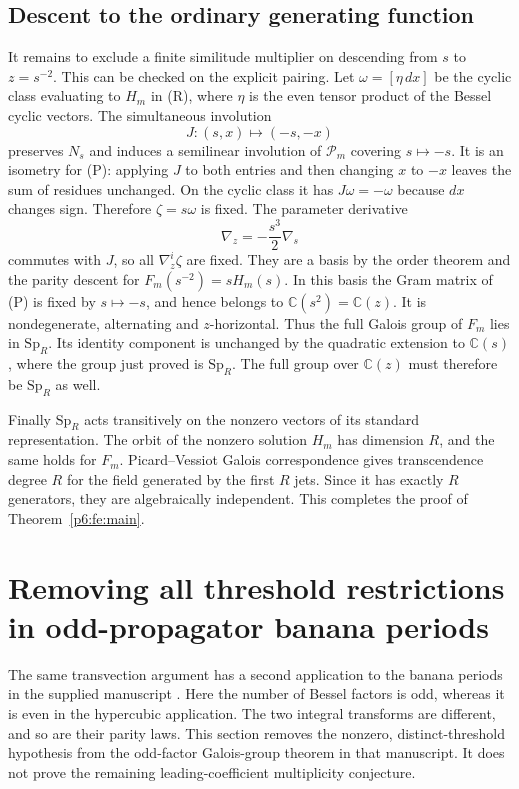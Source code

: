 \documentclass[11pt,a4paper]{article}
\theoremstyle{definition}
\theoremstyle{remark}
\numberwithin{equation}{section}
\begin{document}
\subsection{Descent to the ordinary generating function}

It remains to exclude a finite similitude multiplier on descending
from $s$ to $z=s^{-2}$. This can be checked on the explicit pairing.
Let $\omega=[\eta\,dx]$ be the cyclic class evaluating to $H_m$ in
(R), where $\eta$ is the even tensor product of the Bessel cyclic
vectors. The simultaneous involution
\[
 J:(s,x)\longmapsto(-s,-x)
\]
preserves $N_s$ and induces a semilinear involution of $\mathcal P_m$
covering $s\mapsto-s$. It is an isometry for (P): applying $J$ to
both entries and then changing $x$ to $-x$ leaves the sum of
residues unchanged. On the cyclic class it has $J\omega=-\omega$
because $dx$ changes sign. Therefore $\zeta=s\omega$ is fixed.
The parameter derivative
\[
 \nabla_z=-\frac{s^3}{2}\nabla_s
\]
commutes with $J$, so all $\nabla_z^i\zeta$ are fixed. They are a
basis by the order theorem and the parity descent for
$F_m(s^{-2})=sH_m(s)$. In this basis the Gram matrix of (P) is fixed
by $s\mapsto-s$, and hence belongs to
$\mathbb C(s^2)=\mathbb C(z)$. It is nondegenerate, alternating
and $z$-horizontal. Thus the full Galois group of $F_m$ lies in
$\mathrm{Sp}_R$. Its identity component is unchanged by the
quadratic extension to $\mathbb C(s)$, where the group just proved
is $\mathrm{Sp}_R$. The full group over $\mathbb C(z)$ must therefore
be $\mathrm{Sp}_R$ as well.

Finally $\mathrm{Sp}_R$ acts transitively on the nonzero vectors of
its standard representation. The orbit of the nonzero solution
$H_m$ has dimension $R$, and the same holds for $F_m$.
Picard--Vessiot Galois correspondence gives transcendence degree
$R$ for the field generated by the first $R$ jets. Since it has
exactly $R$ generators, they are algebraically independent.
This completes the proof of Theorem~\ref{p6:fe:main}.


\clearpage

\section{Removing all threshold restrictions in odd-propagator banana periods}
\label{p6:front:banana}

The same transvection argument has a second application to the banana
periods in the supplied manuscript \cite{p5:Keio032}. Here the number of
Bessel factors is odd, whereas it is even in the hypercubic application.
The two integral transforms are different, and so are their parity laws.
This section removes the nonzero, distinct-threshold hypothesis from the
odd-factor Galois-group theorem in that manuscript. It does not prove
the remaining leading-coefficient multiplicity conjecture.
\end{document}
